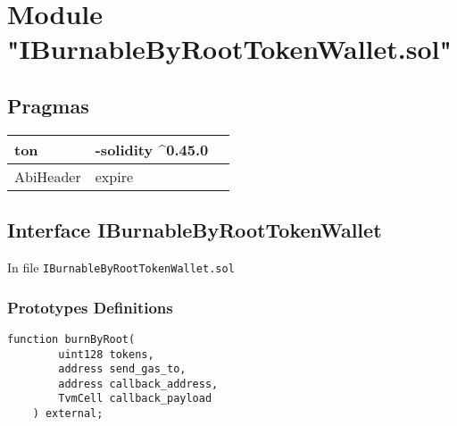 
\section{Module "IBurnableByRootTokenWallet.sol"}


\subsection{Pragmas}


\noindent\begin{tabular}{|l|l|p{5cm}|}\hline
ton & -solidity \^{}0.45.0 &\\\hline
AbiHeader &  expire &\\\hline
\end{tabular}


\subsection{Interface IBurnableByRootTokenWallet}


In file {\tt IBurnableByRootTokenWallet.sol}

\subsubsection{Prototypes Definitions}

\vspace{2cm}

\begin{lstlisting}[firstnumber=5]
    function burnByRoot(
        uint128 tokens,
        address send_gas_to,
        address callback_address,
        TvmCell callback_payload
    ) external;
\end{lstlisting}
